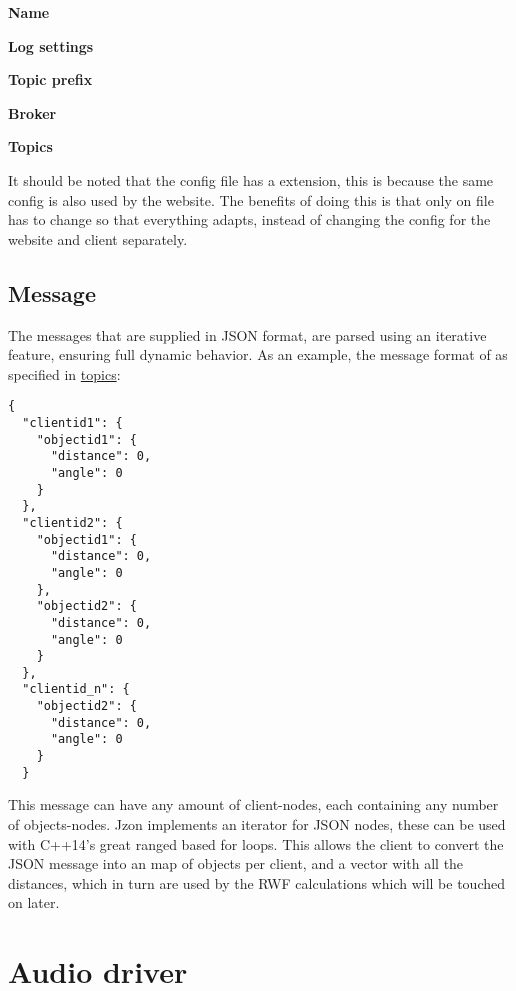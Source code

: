 \begin{shortlist}
	\item \textbf{Name}
	\item \textbf{Log settings}
	\item \textbf{Topic prefix}
	\item \textbf{Broker}
	\item \textbf{Topics}
\end{shortlist}

It should be noted that the config file has a  extension, this is because the same config is also used by the website.
The benefits of doing this is that only on file has to change so that everything adapts, instead of changing the config for the website and client separately.

\subsection{Message}
The messages that are supplied in JSON format, are parsed using an iterative feature, ensuring full dynamic behavior.
As an example, the message format of  as specified in \hyperref[chap:Topics]{topics}:
\begin{lstlisting}
{
  "clientid1": {
    "objectid1": {
      "distance": 0,
      "angle": 0
    }
  },
  "clientid2": {
    "objectid1": {
      "distance": 0,
      "angle": 0
    },
    "objectid2": {
      "distance": 0,
      "angle": 0
    }
  },
  "clientid_n": {
    "objectid2": {
      "distance": 0,
      "angle": 0
    }
  }
\end{lstlisting}

This message can have any amount  of client-nodes, each containing any number  of objects-nodes.
Jzon implements an iterator for JSON nodes, these can be used with C++14's great ranged based for loops.
This allows the client to convert the JSON message into an map of objects per client, and a vector with all the distances,
which in turn are used by the RWF calculations which will be touched on later.

\section{Audio driver}
\label{sec:client_audio_driver}

